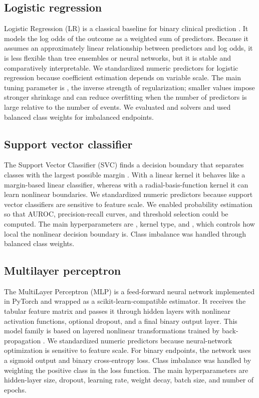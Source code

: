 \documentclass[11pt,a4paper]{article}
\newcommand{\code}[1]{\texttt{\detokenize{#1}}}
\begin{document}
\subsection{Logistic regression}

Logistic Regression (LR) is a classical baseline for binary clinical prediction \cite{cox1958binary}. It models the log odds of the outcome as a weighted sum of predictors. Because it assumes an approximately linear relationship between predictors and log odds, it is less flexible than tree ensembles or neural networks, but it is stable and comparatively interpretable. We standardized numeric predictors for logistic regression because coefficient estimation depends on variable scale. The main tuning parameter is \code{C}, the inverse strength of regularization; smaller values impose stronger shrinkage and can reduce overfitting when the number of predictors is large relative to the number of events. We evaluated \code{lbfgs} and \code{liblinear} solvers and used balanced class weights for imbalanced endpoints.

\subsection{Support vector classifier}

The Support Vector Classifier (SVC) finds a decision boundary that separates classes with the largest possible margin \cite{cortes1995support}. With a linear kernel it behaves like a margin-based linear classifier, whereas with a radial-basis-function kernel it can learn nonlinear boundaries. We standardized numeric predictors because support vector classifiers are sensitive to feature scale. We enabled probability estimation so that AUROC, precision-recall curves, and threshold selection could be computed. The main hyperparameters are \code{C}, kernel type, and \code{gamma}, which controls how local the nonlinear decision boundary is. Class imbalance was handled through balanced class weights.

\subsection{Multilayer perceptron}

The MultiLayer Perceptron (MLP) is a feed-forward neural network implemented in PyTorch and wrapped as a scikit-learn-compatible estimator. It receives the tabular feature matrix and passes it through hidden layers with nonlinear activation functions, optional dropout, and a final binary output layer. This model family is based on layered nonlinear transformations trained by back-propagation \cite{rumelhart1986backpropagation}. We standardized numeric predictors because neural-network optimization is sensitive to feature scale. For binary endpoints, the network uses a sigmoid output and binary cross-entropy loss. Class imbalance was handled by weighting the positive class in the loss function. The main hyperparameters are hidden-layer size, dropout, learning rate, weight decay, batch size, and number of epochs.
\end{document}
